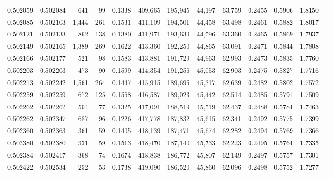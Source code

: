\begin{tabular}{rrrrrrrrrrrrr}
0.502059 & 0.502084 &   641 &    99 &                                     0.1338 & 409,665 & 195,945 &  44,197 &  63,759 & 0.2455 & 0.5906 & 1.8150 \\
0.502085 & 0.502103 & 1,444 &   261 &                                     0.1531 & 411,109 & 194,501 &  44,458 &  63,498 & 0.2461 & 0.5882 & 1.8017 \\
0.502121 & 0.502133 &   862 &   138 &                                     0.1380 & 411,971 & 193,639 &  44,596 &  63,360 & 0.2465 & 0.5869 & 1.7937 \\
0.502149 & 0.502165 & 1,389 &   269 &                                     0.1622 & 413,360 & 192,250 &  44,865 &  63,091 & 0.2471 & 0.5844 & 1.7808 \\
0.502166 & 0.502177 &   521 &    98 &                                     0.1583 & 413,881 & 191,729 &  44,963 &  62,993 & 0.2473 & 0.5835 & 1.7760 \\
0.502203 & 0.502203 &   473 &    90 &                                     0.1599 & 414,354 & 191,256 &  45,053 &  62,903 & 0.2475 & 0.5827 & 1.7716 \\
0.502213 & 0.502242 & 1,561 &   264 &                                     0.1447 & 415,915 & 189,695 &  45,317 &  62,639 & 0.2482 & 0.5802 & 1.7572 \\
0.502259 & 0.502259 &   672 &   125 &                                     0.1568 & 416,587 & 189,023 &  45,442 &  62,514 & 0.2485 & 0.5791 & 1.7509 \\
0.502262 & 0.502262 &   504 &    77 &                                     0.1325 & 417,091 & 188,519 &  45,519 &  62,437 & 0.2488 & 0.5784 & 1.7463 \\
0.502262 & 0.502347 &   687 &    96 &                                     0.1226 & 417,778 & 187,832 &  45,615 &  62,341 & 0.2492 & 0.5775 & 1.7399 \\
0.502360 & 0.502363 &   361 &    59 &                                     0.1405 & 418,139 & 187,471 &  45,674 &  62,282 & 0.2494 & 0.5769 & 1.7366 \\
0.502380 & 0.502380 &   331 &    59 &                                     0.1513 & 418,470 & 187,140 &  45,733 &  62,223 & 0.2495 & 0.5764 & 1.7335 \\
0.502384 & 0.502417 &   368 &    74 &                                     0.1674 & 418,838 & 186,772 &  45,807 &  62,149 & 0.2497 & 0.5757 & 1.7301 \\
0.502422 & 0.502534 &   252 &    53 &                                     0.1738 & 419,090 & 186,520 &  45,860 &  62,096 & 0.2498 & 0.5752 & 1.7277 \\

\end{tabular}
